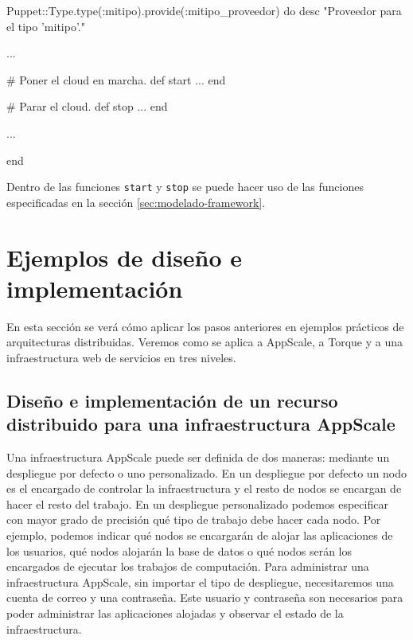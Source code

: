 \begin{rubycode}
Puppet::Type.type(:mitipo).provide(:mitipo_proveedor) do
   desc "Proveedor para el tipo 'mitipo'."

   ...

   # Poner el cloud en marcha.
   def start
      ...
   end

   # Parar el cloud.
   def stop
      ...
   end
   
   ...
   
end
\end{rubycode}

Dentro de las funciones \texttt{start} y \texttt{stop} se puede hacer uso de las funciones especificadas en la sección \ref{sec:modelado-framework}.

\section{Ejemplos de diseño e implementación}

En esta sección se verá cómo aplicar los pasos anteriores en ejemplos prácticos de arquitecturas distribuidas. Veremos como se aplica a AppScale, a Torque y a una infraestructura web de servicios en tres niveles.

\subsection{Diseño e implementación de un recurso distribuido para una infraestructura AppScale}

Una infraestructura AppScale puede ser definida de dos maneras: mediante un despliegue por defecto o uno personalizado. En un despliegue por defecto un nodo es el encargado de controlar la infraestructura y el resto de nodos se encargan de hacer el resto del trabajo. En un despliegue personalizado podemos especificar con mayor grado de precisión qué tipo de trabajo debe hacer cada nodo. Por ejemplo, podemos indicar qué nodos se encargarán de alojar las aplicaciones de los usuarios, qué nodos alojarán la base de datos o qué nodos serán los encargados de ejecutar los trabajos de computación. Para administrar una infraestructura AppScale, sin importar el tipo de despliegue, necesitaremos una cuenta de correo y una contraseña. Este usuario y contraseña son necesarios para poder administrar las aplicaciones alojadas y observar el estado de la infraestructura. \\

